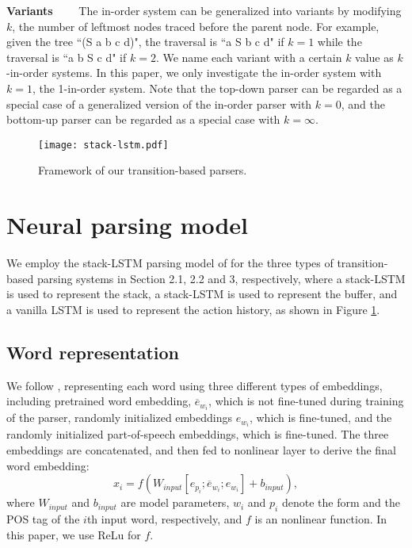 \documentclass[11pt,letterpaper]{article}
\begin{document}
\textbf{Variants}~~~~
The in-order system can be generalized into variants by modifying $k$, the number of leftmost nodes traced before the parent node.
For example, given the tree ``(S a b c d)", the traversal is ``a S b c d" if $k=1$ while the traversal is ``a b S c d" if $k=2$.
We name each variant with a certain $k$ value as $k$-in-order systems.
In this paper, we only investigate the in-order system with $k=1$, the 1-in-order system.
Note that the top-down parser can be regarded as a special case of a generalized version of the in-order parser with $k=0$, and the bottom-up parser can be regarded as a special case with $k=\infty$.
\begin{figure}
\begin{center}
\texttt{[image: stack-lstm.pdf]}
\end{center}
\caption{\label{stacklstm} Framework of our transition-based parsers.}
\end{figure}
\section{Neural parsing model}
We employ the stack-LSTM parsing model of  for the three types of transition-based parsing systems in Section 2.1, 2.2 and 3, respectively, where a stack-LSTM is used to represent the stack, a stack-LSTM is used to represent the buffer, and a vanilla LSTM is used to represent the action history, as shown in Figure \ref{stacklstm}.

\subsection{Word representation}
We follow , representing each word using three different types of embeddings, including pretrained word embedding, $\overline{e}_{w_i}$, which is not fine-tuned during training of the parser, randomly initialized embeddings $e_{w_i}$, which is fine-tuned, and the randomly initialized part-of-speech embeddings, which is fine-tuned.
The three embeddings are concatenated, and then fed to nonlinear layer to derive the final word embedding: 
\begin{equation*}
x_i = f(W_{input}[e_{p_i}; \overline{e}_{w_i}; e_{w_i}]+b_{input}),
\end{equation*}
where $W_{input}$ and $b_{input}$ are model parameters, $w_i$ and $p_i$ denote the form and the POS tag of the $i$th input word, respectively, and $f$ is an nonlinear function.
In this paper, we use ReLu for $f$. 
\end{document}
